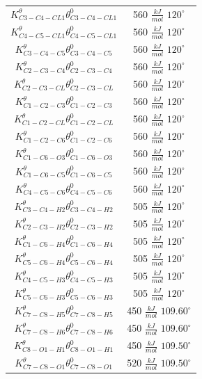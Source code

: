 \begin{table}[!h]
    \centering
    \begin{tabular}{|c|c|}
    \hline
    $K^{\theta}_{C3-C4-CL1} \theta^0_{C3-C4-CL1}$& 560 $\frac{kJ}{mol}$ $120^{\circ}$\\
    $K^{\theta}_{C4-C5-CL1} \theta^0_{C4-C5-CL1}$& 560 $\frac{kJ}{mol}$ $120^{\circ}$\\
    $K^{\theta}_{C3-C4-C5} \theta^0_{C3-C4-C5}$& 560 $\frac{kJ}{mol}$ $120^{\circ}$\\
    $K^{\theta}_{C2-C3-C4} \theta^0_{C2-C3-C4}$& 560 $\frac{kJ}{mol}$ $120^{\circ}$\\
    $K^{\theta}_{C2-C3-CL} \theta^0_{C2-C3-CL}$& 560 $\frac{kJ}{mol}$ $120^{\circ}$\\
    $K^{\theta}_{C1-C2-C3} \theta^0_{C1-C2-C3}$& 560 $\frac{kJ}{mol}$ $120^{\circ}$\\
    $K^{\theta}_{C1-C2-CL} \theta^0_{C1-C2-CL}$& 560 $\frac{kJ}{mol}$ $120^{\circ}$\\
    $K^{\theta}_{C1-C2-C6} \theta^0_{C1-C2-C6}$& 560 $\frac{kJ}{mol}$ $120^{\circ}$\\
    $K^{\theta}_{C1-C6-O3} \theta^0_{C1-C6-O3}$& 560 $\frac{kJ}{mol}$ $120^{\circ}$\\
    $K^{\theta}_{C1-C6-C5} \theta^0_{C1-C6-C5}$& 560 $\frac{kJ}{mol}$ $120^{\circ}$\\
    $K^{\theta}_{C4-C5-C6} \theta^0_{C4-C5-C6}$& 560 $\frac{kJ}{mol}$ $120^{\circ}$\\

    $K^{\theta}_{C3-C4-H2} \theta^0_{C3-C4-H2}$& 505 $\frac{kJ}{mol}$ $120^{\circ}$\\
    $K^{\theta}_{C2-C3-H2} \theta^0_{C2-C3-H2}$& 505 $\frac{kJ}{mol}$ $120^{\circ}$\\
    $K^{\theta}_{C1-C6-H4} \theta^0_{C1-C6-H4}$& 505 $\frac{kJ}{mol}$ $120^{\circ}$\\
    $K^{\theta}_{C5-C6-H4} \theta^0_{C5-C6-H4}$& 505 $\frac{kJ}{mol}$ $120^{\circ}$\\
    $K^{\theta}_{C4-C5-H3} \theta^0_{C4-C5-H3}$& 505 $\frac{kJ}{mol}$ $120^{\circ}$\\
    $K^{\theta}_{C5-C6-H3} \theta^0_{C5-C6-H3}$& 505 $\frac{kJ}{mol}$ $120^{\circ}$\\
    
    $K^{\theta}_{C7-C8-H5} \theta^0_{C7-C8-H5}$& 450 $\frac{kJ}{mol}$ $109.60^{\circ}$\\
    $K^{\theta}_{C7-C8-H6} \theta^0_{C7-C8-H6}$& 450 $\frac{kJ}{mol}$ $109.60^{\circ}$\\
    $K^{\theta}_{C8-O1-H1} \theta^0_{C8-O1-H1}$& 450 $\frac{kJ}{mol}$ $109.50^{\circ}$\\
    $K^{\theta}_{C7-C8-O1} \theta^0_{C7-C8-O1}$& 520 $\frac{kJ}{mol}$ $109.50^{\circ}$\\
    

\end{tabular}
\end{table}
